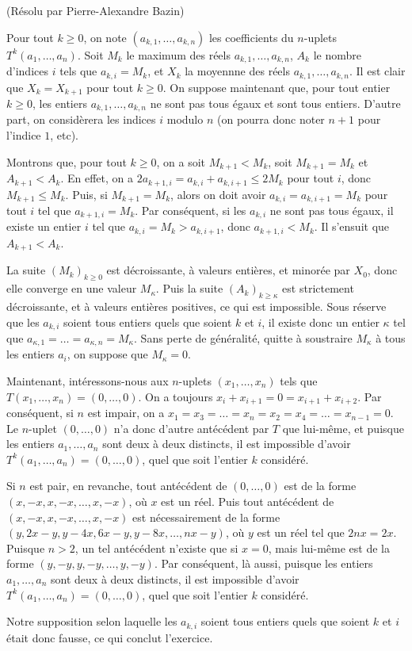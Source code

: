 \begin{sol}[100](Résolu par Pierre-Alexandre Bazin)
 
Pour tout $k \geq 0$, on note $(a_{k,1},\ldots,a_{k,n})$ les coefficients du $n$-uplets $T^k(a_1,\ldots,a_n)$.
Soit $M_k$ le maximum des réels $a_{k,1},\ldots,a_{k,n}$, $A_k$ le nombre d'indices $i$ tels que $a_{k,i} = M_k$,
et $X_k$ la moyennne des réels $a_{k,1},\ldots,a_{k,n}$.
Il est clair que $X_k = X_{k+1}$ pour tout $k \geq 0$.
On suppose maintenant que, pour tout entier $k \geq 0$, les entiers $a_{k,1},\ldots,a_{k,n}$ ne sont pas tous égaux et sont tous entiers.
D'autre part, on considèrera les indices $i$ modulo $n$ (on pourra donc noter $n+1$ pour l'indice $1$, etc).

Montrons que, pour tout $k \geq 0$, on a soit $M_{k+1} < M_k$, soit $M_{k+1} = M_k$ et $A_{k+1} < A_k$.
En effet, on a $2 a_{k+1,i} = a_{k,i} + a_{k,i+1} \leq 2 M_k$ pour tout $i$, donc $M_{k+1} \leq M_k$.
Puis, si $M_{k+1} = M_k$, alors on doit avoir $a_{k,i} = a_{k,i+1} = M_k$ pour tout $i$ tel que $a_{k+1,i} = M_k$.
Par conséquent, si les $a_{k,i}$ ne sont pas tous égaux, il existe un entier $i$ tel que
$a_{k,i} = M_k > a_{k,i+1}$, donc $a_{k+1,i} < M_k$.
Il s'ensuit que $A_{k+1} < A_k$.

La suite $(M_k)_{k \geq 0}$ est décroissante, à valeurs entières, et minorée par $X_0$, donc elle converge en une valeur $M_\kappa$.
Puis la suite $(A_k)_{k \geq \kappa}$ est strictement décroissante, et à valeurs entières positives, ce qui est impossible.
Sous réserve que les $a_{k,i}$ soient tous entiers quels que soient $k$ et $i$, il existe donc un entier $\kappa$ tel que
$a_{\kappa,1} = \ldots = a_{\kappa,n} = M_\kappa$.
Sans perte de généralité, quitte à soustraire $M_\kappa$ à tous les entiers $a_i$, on suppose que $M_\kappa = 0$.

Maintenant, intéressons-nous aux $n$-uplets $(x_1,\ldots,x_n)$ tels que $T(x_1,\ldots,x_n) = (0,\ldots,0)$.
On a toujours $x_i + x_{i+1} = 0 = x_{i+1} + x_{i+2}$.
Par conséquent, si $n$ est impair, on a $x_1 = x_3 = \ldots = x_n = x_2 = x_4 = \ldots = x_{n-1} = 0$.
Le $n$-uplet $(0,\ldots,0)$ n'a donc d'autre antécédent par $T$ que lui-même, et puisque
les entiers $a_1,\ldots,a_n$ sont deux à deux distincts, il est impossible d'avoir $T^k(a_1,\ldots,a_n) = (0,\ldots,0)$,
quel que soit l'entier $k$ considéré.

Si $n$ est pair, en revanche, tout antécédent de $(0,\ldots,0)$ est de la forme $(x,-x,x,-x,\ldots,x,-x)$, où $x$ est un réel.
Puis tout antécédent de $(x,-x,x,-x,\ldots,x,-x)$ est nécessairement de la forme
$(y,2x-y,y-4x,6x-y,y-8x,\ldots,nx-y)$, où $y$ est un réel tel que $2nx = 2x$. Puisque $n > 2$, un tel antécédent n'existe que si $x = 0$,
mais lui-même est de la forme $(y,-y,y,-y,\ldots,y,-y)$.
Par conséquent, là aussi, puisque les entiers $a_1,\ldots,a_n$ sont deux à deux distincts, il est impossible d'avoir $T^k(a_1,\ldots,a_n) = (0,\ldots,0)$,
quel que soit l'entier $k$ considéré.

Notre supposition selon laquelle les $a_{k,i}$ soient tous entiers quels que soient $k$ et $i$ était donc fausse, ce qui conclut l'exercice.
\end{sol}

